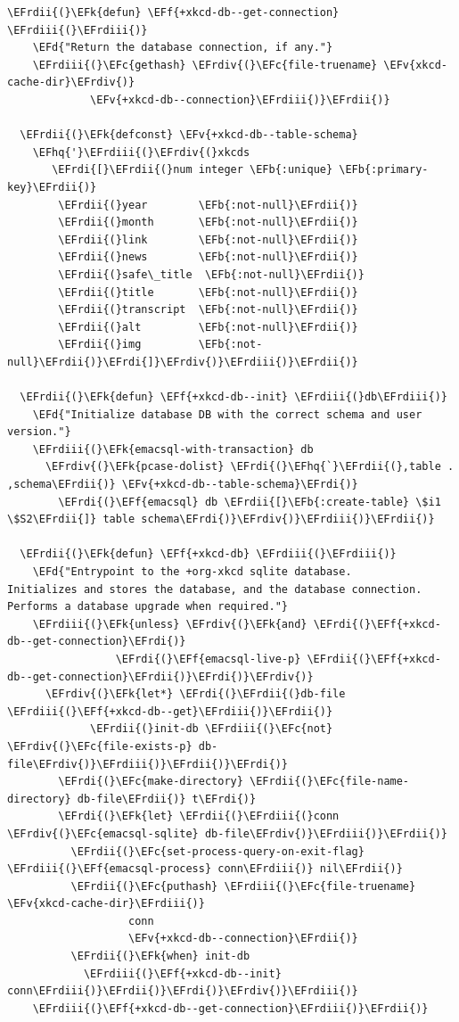 \documentclass{scrartcl}
\newcommand{\EFk}[1]{\textcolor{EFk}{#1}} %
\newcommand{\EFd}[1]{\textcolor{EFd}{\textit{#1}}} %
\newcommand{\EFb}[1]{\textcolor{EFb}{#1}} %
\newcommand{\EFc}[1]{\textcolor{EFc}{#1}} %
\newcommand{\EFv}[1]{\textcolor{EFv}{#1}} %
\newcommand{\EFf}[1]{\textcolor{EFf}{#1}} %
\newcommand{\EFhq}[1]{\textcolor{EFhq}{#1}} %
\newcommand{\EFrdi}[1]{\textcolor{EFrdi}{#1}} %
\newcommand{\EFrdii}[1]{\textcolor{EFrdii}{#1}} %
\newcommand{\EFrdiii}[1]{\textcolor{EFrdiii}{#1}} %
\newcommand{\EFrdiv}[1]{\textcolor{EFrdiv}{#1}} %
\begin{document}
\begin{Code}
\begin{Verbatim}[]
  \EFrdii{(}\EFk{defun} \EFf{+xkcd-db--get-connection} \EFrdiii{(}\EFrdiii{)}
    \EFd{"Return the database connection, if any."}
    \EFrdiii{(}\EFc{gethash} \EFrdiv{(}\EFc{file-truename} \EFv{xkcd-cache-dir}\EFrdiv{)}
             \EFv{+xkcd-db--connection}\EFrdiii{)}\EFrdii{)}

  \EFrdii{(}\EFk{defconst} \EFv{+xkcd-db--table-schema}
    \EFhq{'}\EFrdiii{(}\EFrdiv{(}xkcds
       \EFrdi{[}\EFrdii{(}num integer \EFb{:unique} \EFb{:primary-key}\EFrdii{)}
        \EFrdii{(}year        \EFb{:not-null}\EFrdii{)}
        \EFrdii{(}month       \EFb{:not-null}\EFrdii{)}
        \EFrdii{(}link        \EFb{:not-null}\EFrdii{)}
        \EFrdii{(}news        \EFb{:not-null}\EFrdii{)}
        \EFrdii{(}safe\_title  \EFb{:not-null}\EFrdii{)}
        \EFrdii{(}title       \EFb{:not-null}\EFrdii{)}
        \EFrdii{(}transcript  \EFb{:not-null}\EFrdii{)}
        \EFrdii{(}alt         \EFb{:not-null}\EFrdii{)}
        \EFrdii{(}img         \EFb{:not-null}\EFrdii{)}\EFrdi{]}\EFrdiv{)}\EFrdiii{)}\EFrdii{)}

  \EFrdii{(}\EFk{defun} \EFf{+xkcd-db--init} \EFrdiii{(}db\EFrdiii{)}
    \EFd{"Initialize database DB with the correct schema and user version."}
    \EFrdiii{(}\EFk{emacsql-with-transaction} db
      \EFrdiv{(}\EFk{pcase-dolist} \EFrdi{(}\EFhq{`}\EFrdii{(},table . ,schema\EFrdii{)} \EFv{+xkcd-db--table-schema}\EFrdi{)}
        \EFrdi{(}\EFf{emacsql} db \EFrdii{[}\EFb{:create-table} \$i1 \$S2\EFrdii{]} table schema\EFrdi{)}\EFrdiv{)}\EFrdiii{)}\EFrdii{)}

  \EFrdii{(}\EFk{defun} \EFf{+xkcd-db} \EFrdiii{(}\EFrdiii{)}
    \EFd{"Entrypoint to the +org-xkcd sqlite database.
Initializes and stores the database, and the database connection.
Performs a database upgrade when required."}
    \EFrdiii{(}\EFk{unless} \EFrdiv{(}\EFk{and} \EFrdi{(}\EFf{+xkcd-db--get-connection}\EFrdi{)}
                 \EFrdi{(}\EFf{emacsql-live-p} \EFrdii{(}\EFf{+xkcd-db--get-connection}\EFrdii{)}\EFrdi{)}\EFrdiv{)}
      \EFrdiv{(}\EFk{let*} \EFrdi{(}\EFrdii{(}db-file \EFrdiii{(}\EFf{+xkcd-db--get}\EFrdiii{)}\EFrdii{)}
             \EFrdii{(}init-db \EFrdiii{(}\EFc{not} \EFrdiv{(}\EFc{file-exists-p} db-file\EFrdiv{)}\EFrdiii{)}\EFrdii{)}\EFrdi{)}
        \EFrdi{(}\EFc{make-directory} \EFrdii{(}\EFc{file-name-directory} db-file\EFrdii{)} t\EFrdi{)}
        \EFrdi{(}\EFk{let} \EFrdii{(}\EFrdiii{(}conn \EFrdiv{(}\EFc{emacsql-sqlite} db-file\EFrdiv{)}\EFrdiii{)}\EFrdii{)}
          \EFrdii{(}\EFc{set-process-query-on-exit-flag} \EFrdiii{(}\EFf{emacsql-process} conn\EFrdiii{)} nil\EFrdii{)}
          \EFrdii{(}\EFc{puthash} \EFrdiii{(}\EFc{file-truename} \EFv{xkcd-cache-dir}\EFrdiii{)}
                   conn
                   \EFv{+xkcd-db--connection}\EFrdii{)}
          \EFrdii{(}\EFk{when} init-db
            \EFrdiii{(}\EFf{+xkcd-db--init} conn\EFrdiii{)}\EFrdii{)}\EFrdi{)}\EFrdiv{)}\EFrdiii{)}
    \EFrdiii{(}\EFf{+xkcd-db--get-connection}\EFrdiii{)}\EFrdii{)}


\end{Verbatim}
\end{Code}
\end{document}
